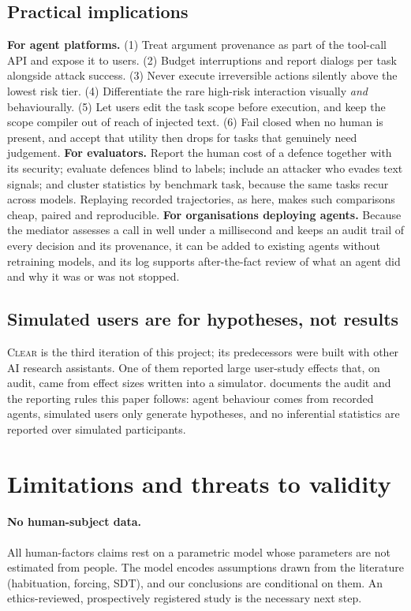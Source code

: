 \documentclass[preprint,12pt,nonatbib]{elsarticle}
\theoremstyle{remark}
\newcommand{\clear}{\textsc{Clear}}
\begin{document}
\subsection{Practical implications}
\label{sec:practice}
\textbf{For agent platforms.} (1) Treat argument provenance as part of the
tool-call API and expose it to users. (2) Budget interruptions and report dialogs
per task alongside attack success. (3) Never execute irreversible actions silently
above the lowest risk tier. (4) Differentiate the rare high-risk interaction
visually \emph{and} behaviourally. (5) Let users edit the task scope before
execution, and keep the scope compiler out of reach of injected text. (6) Fail
closed when no human is present, and accept that utility then drops for tasks
that genuinely need judgement.
\textbf{For evaluators.} Report the human cost of a defence together with its
security; evaluate defences blind to labels; include an attacker who evades text
signals; and cluster statistics by benchmark task, because the same tasks recur
across models. Replaying recorded trajectories, as here, makes such comparisons
cheap, paired and reproducible.
\textbf{For organisations deploying agents.} Because the mediator assesses a call
in well under a millisecond and keeps an audit trail of every decision and its
provenance, it can be added to existing agents without retraining models, and
its log supports after-the-fact review of what an agent did and why it was or
was not stopped.

\subsection{Simulated users are for hypotheses, not results}
\clear{} is the third iteration of this project; its predecessors were built with
other AI research assistants. One of them reported large user-study effects that,
on audit, came from effect sizes written into a simulator. 
documents the audit and the reporting rules this paper follows: agent behaviour
comes from recorded agents, simulated users only generate hypotheses, and no
inferential statistics are reported over simulated participants.

\section{Limitations and threats to validity}
\label{sec:validity}

\paragraph{No human-subject data.} All human-factors claims rest on a parametric
model whose parameters are not estimated from people. The model encodes
assumptions drawn from the literature (habituation, forcing, SDT), and our
conclusions are conditional on them. An ethics-reviewed, prospectively
registered study is the necessary next step.
\end{document}
